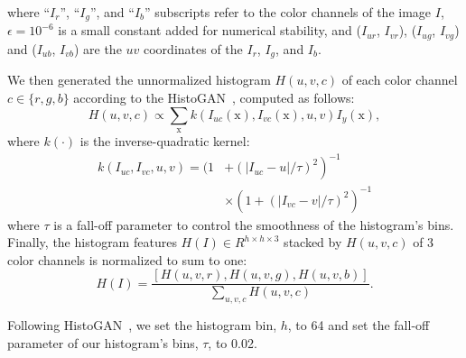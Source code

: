 where ``$I_r$'', ``$I_g$'', and ``$I_b$'' subscripts refer to the color channels of the image $I$, $\epsilon=\text{10}^{-\text{6}}$ is a small constant added for numerical stability, and ($I_{ur}$, $I_{vr}$), ($I_{ug}$, $I_{vg}$) and ($I_{ub}$, $I_{vb}$) are the $uv$ coordinates of the $I_r$, $I_g$, and $I_b$.

We then generated the unnormalized histogram $H(u,v,c)$ of each color channel $c \in \{r,g,b\}$ according to the HistoGAN~\cite{Afifi2021histogan}, computed as follows:
\begin{equation}
H(u,v,c) \propto \sum_{\mathrm{x}} k\left(I_{uc}(\mathrm{x}), I_{vc}(\mathrm{x}), u, v\right) I_y(\mathrm{x}),
\end{equation}
where $k(\cdot)$ is the inverse-quadratic kernel:
\begin{equation}
\begin{aligned}
k\left(I_{uc}, I_{vc}, u, v\right)=(1 & \left.+\left(\left|I_{uc}-u\right| / \tau\right)^2\right)^{-1} \\
& \times\left(1+\left(\left|I_{vc}-v\right| / \tau\right)^2\right)^{-1}
\end{aligned}
\end{equation}
where $\tau$ is a fall-off parameter to control the smoothness of the histogram's bins. Finally, the histogram features $H(I) \in R^{h \times h \times 3}$ stacked by $H(u,v,c)$ of 3 color channels is normalized to sum to one:
\begin{equation}
H(I) = \frac{[H(u,v,r), H(u,v,g), H(u,v,b)]}{\sum_{u,v,c} H(u, v, c)}.
\end{equation}

Following HistoGAN~\cite{Afifi2021histogan}, we set the histogram bin, $h$, to 64 and set the fall-off parameter of our histogram's bins, $\tau$, to 0.02.